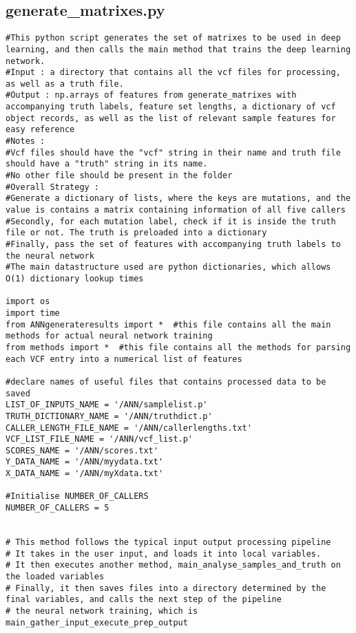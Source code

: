 \documentclass{article}
\begin{document}
\subsection{generate\_matrixes.py}
\begin{verbatim}
#This python script generates the set of matrixes to be used in deep learning, and then calls the main method that trains the deep learning network.
#Input : a directory that contains all the vcf files for processing, as well as a truth file. 
#Output : np.arrays of features from generate_matrixes with accompanying truth labels, feature set lengths, a dictionary of vcf object records, as well as the list of relevant sample features for easy reference
#Notes :
#Vcf files should have the "vcf" string in their name and truth file should have a "truth" string in its name.
#No other file should be present in the folder
#Overall Strategy :
#Generate a dictionary of lists, where the keys are mutations, and the value is contains a matrix containing information of all five callers
#Secondly, for each mutation label, check if it is inside the truth file or not. The truth is preloaded into a dictionary
#Finally, pass the set of features with accompanying truth labels to the neural network 
#The main datastructure used are python dictionaries, which allows O(1) dictionary lookup times 

import os  
import time
from ANNgenerateresults import *  #this file contains all the main methods for actual neural network training
from methods import *  #this file contains all the methods for parsing each VCF entry into a numerical list of features

#declare names of useful files that contains processed data to be saved
LIST_OF_INPUTS_NAME = '/ANN/samplelist.p'     
TRUTH_DICTIONARY_NAME = '/ANN/truthdict.p'
CALLER_LENGTH_FILE_NAME = '/ANN/callerlengths.txt'
VCF_LIST_FILE_NAME = '/ANN/vcf_list.p'
SCORES_NAME = '/ANN/scores.txt'
Y_DATA_NAME = '/ANN/myydata.txt'
X_DATA_NAME = '/ANN/myXdata.txt'

#Initialise NUMBER_OF_CALLERS
NUMBER_OF_CALLERS = 5


# This method follows the typical input output processing pipeline 
# It takes in the user input, and loads it into local variables. 
# It then executes another method, main_analyse_samples_and_truth on the loaded variables
# Finally, it then saves files into a directory determined by the final variables, and calls the next step of the pipeline
# the neural network training, which is main_gather_input_execute_prep_output


\end{verbatim}
\end{document}
